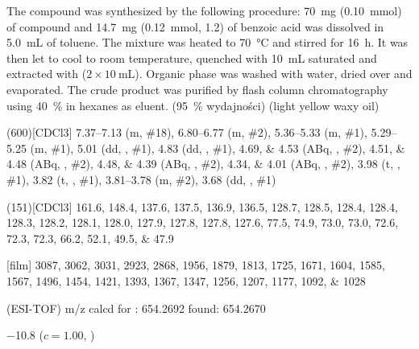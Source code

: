 The compound was synthesized by the following procedure:
\SI{70}{\milli\gram} (\SI{0.10}{\milli\mol}) of compound  and
\SI{14.7}{\milli\gram} (\SI{0.12}{\milli\mol}, \SI{1.2}{\equiv}) of benzoic acid
was dissolved in \SI{5.0}{\milli\liter} of toluene.
The mixture was heated to \SI{70}{\degreeCelsius} and stirred for \SI{16}{\hour}.
It was then let to cool to room temperature, quenched with \SI{10}{\milli\liter} saturated  and extracted with  ($2 \times \SI{10}{\milli\liter}$).
Organic phase was washed with water, dried over  and evaporated.
The crude product was purified by flash column chromatography using \SI{40}{\percent}  in hexanes as eluent.
(\SI{95}{\percent} wydajności) (light yellow waxy oil)
\begin{fullexp}
	\NMR(600)[CDCl3] \numrange{7.37}{7.13} (m, \#{18}), \numrange{6.80}{6.77} (m, \#{2}), \numrange{5.36}{5.33} (m, \#{1}), \numrange{5.29}{5.25} (m, \#{1}), \num{5.01} (dd, , \#{1}), \num{4.83} (dd, , \#{1}), \numlist{4.69;4.53} (ABq, , \#{2}), \numlist{4.51;4.48} (ABq, , \#{2}), \numlist{4.48;4.39} (ABq, , \#{2}), \numlist{4.34;4.01} (ABq, , \#{2}), \num{3.98} (t, , \#{1}), \num{3.82} (t, , \#{1}), \numrange{3.81}{3.78} (m, \#{2}), \num{3.68} (dd, , \#{1})\par\noindent
	(151)[CDCl3] \numlist{161.6; 148.4; 137.6; 137.5; 136.9; 136.5; 128.7; 128.5; 128.4; 128.4; 128.3; 128.2; 128.1; 128.0; 127.9; 127.8; 127.8; 127.6; 77.5; 74.9; 73.0; 73.0; 72.6; 72.3; 72.3; 66.2; 52.1; 49.5; 47.9}\par\noindent
	[film] \numlist{3087; 3062; 3031; 2923; 2868; 1956; 1879; 1813; 1725; 1671; 1604; 1585; 1567; 1496; 1454; 1421; 1393; 1367; 1347; 1256; 1207; 1177; 1092; 1028}\par\noindent
	 (ESI-TOF) m/z calcd for : \num{654.2692} found: \num{654.2670}\par\noindent
	\data{[$\alpha^{23}_D$]~$=$} \num{-10.8} ($c = 1.00$, )
\end{fullexp}

